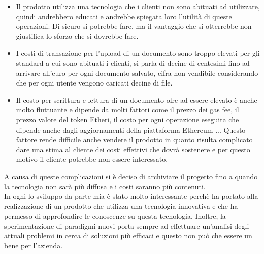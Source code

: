\begin{itemize}
    \item Il prodotto utilizza una tecnologia che i clienti non sono abituati
        ad utilizzare, quindi andrebbero educati e andrebbe spiegata loro 
        l'utilità di queste operazioni. Di sicuro si potrebbe fare, ma il 
        vantaggio che si otterrebbe non giustifica lo sforzo che si dovrebbe
        fare. 
    \item I costi di transazione per l'upload di un documento sono troppo 
        elevati per gli standard a cui sono abituati i clienti, si parla di 
        decine di centesimi fino ad arrivare all'euro per ogni documento 
        salvato, cifra non vendibile considerando che per ogni utente vengono 
        caricati decine di file. 
    \item Il costo per scrittura e lettura di un documento olre ad essere 
        elevato è anche molto fluttuante e dipende da molti fattori come il 
        prezzo dei gas fee, il prezzo valore del token Etheri, il costo 
        per ogni operazione eseguita che dipende anche dagli aggiornamenti
        della piattaforma Ethereum ...
        Questo fattore rende difficile anche vendere il prodotto in quanto 
        risulta complicato dare una stima al cliente dei costi effettivi che
        dovrà sostenere e per questo motivo il cliente potrebbe non essere
        interessato.
\end{itemize}

A causa di queste complicazioni si è deciso di archiviare il progetto fino a 
quando la tecnologia non sarà più diffusa e i costi saranno più contenuti. \\
In ogni lo sviluppo da parte mia è stato molto interessante perchè ha portato
alla realizzazione di un prodotto che utilizza una tecnologia innovativa e che
ha permesso di approfondire le conoscenze su questa tecnologia. Inoltre, la
sperimentazione di paradigmi nuovi porta sempre ad effettuare un'analisi degli
attuali problemi in cerca di soluzioni più efficaci e questo non può che essere
un bene per l'azienda.
